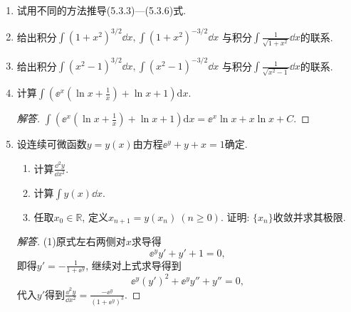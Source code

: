 \begin{3a}
\begin{enumerate}
\begin{proof}[解答]
后四个的计算量稍大,但是细心是不会出错的. \[\int x^2\arcsin^2 x\dd x=\int\arcsin^2x\dd\left(\frac{x^3}{3}\right)=\frac{x^3\arcsin^2x}{3}-\frac{2}{3}\int\arcsin x\cdot\frac{x^3}{\sqrt{1-x^2}}\dd x,\]一个可行的方法是寻找一阶微分形式\(\frac{x^3}{\sqrt{1-x^2}}\dd x\)的原函数, 于是置\(x=\sin t\), 从而\[\begin{aligned}
\int\frac{x^3}{\sqrt{1-x^2}}\dd x=\int\sin^3t\dd t=\int\left(\cos^2t-1\right)\dd\left(\cos t\right)=\frac{\cos^3t}{3}-\cos t+C.
\end{aligned}\]即有\[\begin{aligned}
&\int\arcsin x\cdot\frac{x^3}{\sqrt{1-x^2}}\dd x=\int\arcsin x\dd\left(\frac{\left(\sqrt{1-x^2}\right)^3}{3}-\sqrt{1-x^2}\right)\\
&=\left(\frac{\left(\sqrt{1-x^2}\right)^3}{3}-\sqrt{1-x^2}\right)\arcsin x-\int\left(\frac{1-x^2}{3}-1\right)\dd x\\
&=\left(\frac{\left(\sqrt{1-x^2}\right)^3}{3}-\sqrt{1-x^2}\right)\arcsin x+\frac{2x}{3}+\frac{x^3}{9}+C.
\end{aligned}\]代回即得\[\int x^2\arcsin^2 x\dd x
=\frac{x^3\arcsin^2x}{3}-\frac{2}{3}\left(\frac{\left(\sqrt{1-x^2}\right)^3}{3}
-\sqrt{1-x^2}\right)\arcsin x-\frac{4x}{9}-\frac{2x^3}{27}+C.\]
(6)与此十分相似:
\[\begin{aligned}
\int x^3\arcsin^2x\dd x&=\frac{x^4\arcsin^2x}{4}-\frac{3\arcsin^2x}{16}+\frac{3x\sqrt{1-x^2}\arcsin x}{16}\\
&+\frac{x^3\sqrt{1-x^2}\arcsin x}{2}+\frac{3x}{16}-\frac{3x^2}{32}-\frac{x^4}{8}+C.
\end{aligned}\]
\end{proof}
\item 试用不同的方法推导(5.3.3)---(5.3.6)式.
\item 给出积分\(\int\left(1+x^2\right)^{3/2}\dd x,
\int\left(1+x^2\right)^{-3/2}\dd x\)
与积分\(\int\frac{1}{\sqrt{1+x^2}}\dd x\)的联系.
\item 给出积分\(\int\left(x^2-1\right)^{3/2}\dd x,
\int\left(x^2-1\right)^{-3/2}\dd x\)
与积分\(\int\frac{1}{\sqrt{x^2-1}}\dd x\)的联系.
\item 计算\(\int\left(\ee^{x}\left(\ln x+\frac{1}{x}\right)+\ln x+1\right)\mathrm{d}x.\)
\begin{proof}[解答]
\(\int\left(\ee^{x}\left(\ln x+\frac{1}{x}\right)+\ln x+1\right)\mathrm{d}x
=\ee^{x}\ln x+x\ln x+C.\)
\end{proof}
\item 设连续可微函数\(y=y(x)\)由方程\(\ee^{y}+y+x=1\)确定.
\begin{enumerate}[label=(\arabic*)]
\item 计算\(\frac{\dd^2y}{\dd x^2}\).
\item 计算\(\int y(x)\dd x\).
\item 任取\(x_0\in\mathbb{R}\), 定义\(x_{n+1}=y(x_n)\ (n\geqslant 0)\). 证明: \(\{x_n\}\)收敛并求其极限.
\end{enumerate}
\begin{proof}[解答]
(1)原式左右两侧对\(x\)求导得\[\ee^yy'+y'+1=0,\]即得\(y'=-\frac{1}{1+\ee^y}\), 
继续对上式求导得到\[\ee^y(y')^2+\ee^yy''+y''=0,\] 
代入\(y'\)得到\(\frac{\dd^2y}{\dd x^2}=\frac{-\ee^y}{(1+\ee^y)^3}\).


\end{proof}
\end{enumerate}
\end{3a}
